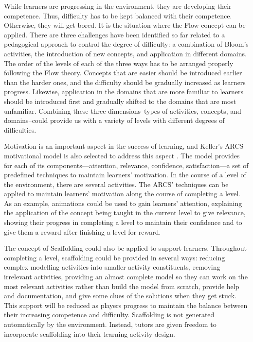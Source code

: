 \documentclass[12pt, a4paper]{report} \usepackage[titletoc]{appendix}
\begin{document}
While learners are progressing in the environment, they are developing their competence. Thus, difficulty has to be kept balanced with their competence. Otherwise, they will get bored. It is the situation where the Flow concept \cite{csikszentmihalyi2014toward} can be applied. There are three challenges have been identified so far related to a pedagogical approach to control the degree of difficulty: a combination of Bloom's activities, the introduction of new concepts, and application in different domains. The order of the levels of each of the three ways has to be arranged properly following the Flow theory. Concepts that are easier should be introduced earlier than the harder ones, and the difficulty should be gradually increased as learners progress. Likewise, application in the domains that are more familiar to learners should be introduced first and gradually shifted to the domains that are most unfamiliar. Combining these three dimensions--types of activities, concepts, and domains--could provide us with a variety of levels with different degrees of difficulties. 

Motivation is an important aspect in the success of learning, and Keller's ARCS motivational model is also selected to address this aspect \cite{keller2010motivational}. The model provides for each of its components---attention, relevance, confidence, satisfaction---a set of predefined techniques to maintain learners' motivation. In the course of a level of the environment, there are several activities. The ARCS' techniques can be applied to maintain learners' motivation along the course of completing a level. As an example, animations could be used to gain learners' attention, explaining the application of the concept being taught in the current level to give relevance, showing their progress in completing a level to maintain their confidence and to give them a reward after finishing a level for reward. 
 
The concept of Scaffolding \cite{vygotsky1978mind, wood1976role} could also be applied to support learners. Throughout completing a level, scaffolding could be provided in several ways: reducing complex modelling activities into smaller activity constituents, removing irrelevant activities, providing an almost complete model so they can work on the most relevant activities rather than build the model from scratch, provide help and documentation, and give some clues of the solutions when they get stuck. This support will be reduced as players progress to maintain the balance between their increasing competence and difficulty. Scaffolding is not generated automatically by the environment. Instead, tutors are given freedom to incorporate scaffolding into their learning activity design. 
\end{document}
